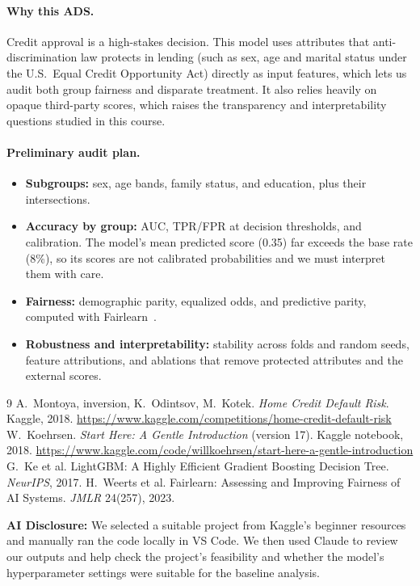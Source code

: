 \documentclass[10pt]{article}
\begin{document}
\paragraph{Why this ADS.}
Credit approval is a high-stakes decision. This model uses attributes that anti-discrimination law protects in lending (such as
sex, age and marital status under the U.S.\ Equal Credit Opportunity Act) directly as input features, which lets us audit both
group fairness and disparate treatment. It also relies heavily on opaque third-party scores, which raises the transparency and
interpretability questions studied in this course.

\paragraph{Preliminary audit plan.}
\begin{itemize}
  \item \textbf{Subgroups:} sex, age bands, family status, and education, plus their intersections.
  \item \textbf{Accuracy by group:} AUC, TPR/FPR at decision thresholds, and calibration. The model's mean predicted score
        (0.35) far exceeds the base rate (8\%), so its scores are not calibrated probabilities and we must interpret them with care.
  \item \textbf{Fairness:} demographic parity, equalized odds, and predictive parity, computed with Fairlearn~\cite{fairlearn}.
  \item \textbf{Robustness and interpretability:} stability across folds and random seeds, feature attributions,
        and ablations that remove protected attributes and the external scores.
\end{itemize}

\vspace{-6pt}
\begin{thebibliography}{9}\small
\setlength{\itemsep}{0pt}
 A.~Montoya, inversion, K.~Odintsov, M.~Kotek. \emph{Home Credit Default Risk}. Kaggle, 2018.
  \url{https://www.kaggle.com/competitions/home-credit-default-risk}
 W.~Koehrsen. \emph{Start Here: A Gentle Introduction} (version 17). Kaggle notebook, 2018.
  \url{https://www.kaggle.com/code/willkoehrsen/start-here-a-gentle-introduction}
 G.~Ke et al. LightGBM: A Highly Efficient Gradient Boosting Decision Tree. \emph{NeurIPS}, 2017.
 H.~Weerts et al. Fairlearn: Assessing and Improving Fairness of AI Systems. \emph{JMLR} 24(257), 2023.
\end{thebibliography}

{\small\textbf{AI Disclosure:} We selected a suitable project from Kaggle's beginner resources and manually ran the code locally in
VS Code. We then used Claude to review our outputs and help check the project's feasibility and whether the model's
hyperparameter settings were suitable for the baseline analysis.\par}
\end{document}
